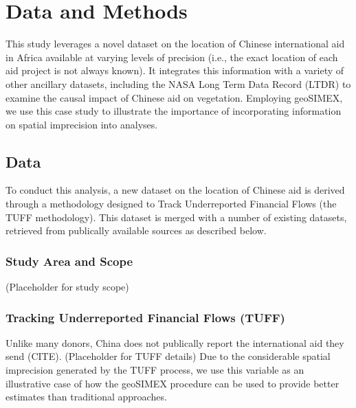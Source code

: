 \section{Data and Methods}
This study leverages a novel dataset on the location of Chinese international aid in Africa available at varying levels of precision (i.e., the exact location of each aid project is not always known).  
It integrates this information with a variety of other ancillary datasets, including the NASA Long Term Data Record (LTDR) to examine the causal impact of Chinese aid on vegetation.  
Employing geoSIMEX, we use this case study to illustrate the importance of incorporating information on spatial imprecision into analyses.
\subsection{Data}
To conduct this analysis, a new dataset on the location of Chinese aid is derived through a methodology designed to Track Underreported Financial Flows (the TUFF methodology).  
This dataset is merged with a number of existing datasets, retrieved from publically available sources as described below.
\subsubsection{Study Area and Scope}
(Placeholder for study scope)
\subsubsection{Tracking Underreported Financial Flows (TUFF)}
Unlike many donors, China does not publically report the international aid they send (CITE).
(Placeholder for TUFF details)
Due to the considerable spatial imprecision generated by the TUFF process, we use this variable as an illustrative case of how the geoSIMEX procedure can be used to provide better estimates than traditional approaches.
